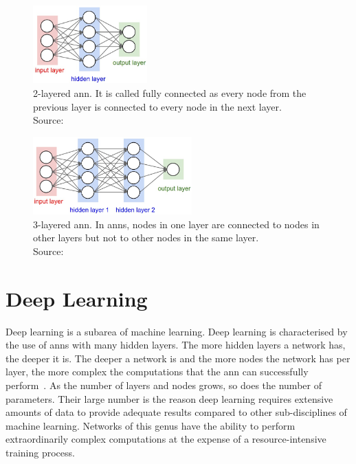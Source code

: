 \documentclass[
			   fontsize=11pt,
               paper=a4,
               bibliography=totoc,
               idxtotoc,
               headsepline,
               footsepline,
               footinclude=false,
               BCOR=12mm,
               DIV=13,
               openany,   %
               ]
               {scrbook}
\begin{document}
\begin{multicols}{2} %
	\begin{figure}[H] %
		\centering
		\includegraphics[height=3cm]{figures/ann1.jpeg}
		\caption[2-Layered ANN]{2-layered \gls{ann}. It is called fully connected as every node from the previous layer is connected to every node in the next layer. \\
			\tiny{Source:~\cite{annGraphics}}}
		\label{fig:2layeredANN} %
	\end{figure}
	
	\columnbreak    %
	
	\begin{figure}[H] %
		\centering
		\includegraphics[height=3cm]{figures/ann2.jpeg}
		\caption[3-Layered ANN]{3-layered \gls{ann}. In \glspl{ann}, nodes in one layer are connected to nodes in other layers but not to other nodes in the same layer. \\
			\tiny{Source:~\cite{annGraphics}}}
		\label{fig:3layeredANN} %
	\end{figure}
\end{multicols}

\newpage

\section{Deep Learning}

Deep learning is a subarea of machine learning. Deep learning is characterised by the use of \glspl{ann} with many hidden layers. The more hidden layers a network has, the deeper it is. The deeper a network is and the more nodes the network has per layer, the more complex the computations that the \gls{ann} can successfully perform~\cite{dlBookGoodf}. As the number of layers and nodes grows, so does the number of parameters. Their large number is the reason deep learning requires extensive amounts of data to provide adequate results compared to other sub-disciplines of machine learning. Networks of this genus have the ability to perform extraordinarily complex computations at the expense of a resource-intensive training process.
\end{document}
